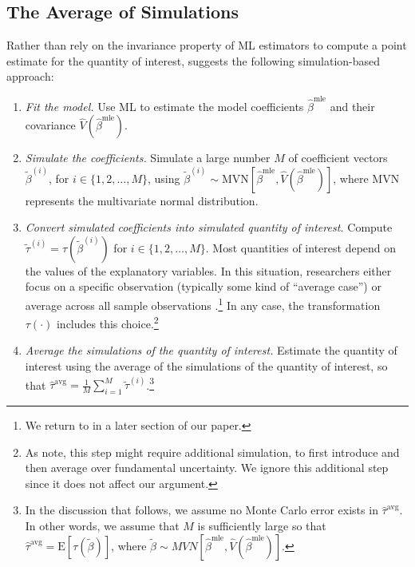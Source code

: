 \documentclass[11pt]{article}
\begin{document}
\subsection*{The Average of Simulations}

Rather than rely on the invariance property of ML estimators to compute a point estimate for the quantity of interest, \cite{KingTomzWittenberg2000} suggests the following simulation-based approach:\vspace{.1in}
\begin{enumerate}
\item \textit{Fit the model.}
Use ML to estimate the model coefficients $\hat{\beta}^{\text{mle}}$ and their covariance $\hat{V} \left( \hat{\beta}^{\text{mle}} \right)$.
\item \textit{Simulate the coefficients.}
Simulate a large number $M$ of coefficient vectors $\tilde{\beta}^{(i)}$, for $i \in \{1, 2,\ldots, M\}$, using $\tilde{\beta}^{(i)} \sim \text{MVN} \left[ \hat{\beta}^{\text{mle}}, \hat{V} \left( \hat{\beta}^{\text{mle}} \right) \right]$, where MVN represents the multivariate normal distribution.
\item \textit{Convert simulated coefficients into simulated quantity of interest.}
Compute $\tilde{\tau}^{(i)} = \tau \left( \tilde{\beta}^{(i)} \right)$ for $i \in \{1, 2,\ldots, M\}$.
Most quantities of interest depend on the values of the explanatory variables.
In this situation, researchers either focus on a specific observation (typically some kind of ``average case'') or average across all sample observations \citep{HanmerKalkan2013}.\footnote{We return to \cite{HanmerKalkan2013} in a later section of our paper.}
In any case, the transformation $\tau(\cdot)$ includes this choice.\footnote{As \cite{KingTomzWittenberg2000} note, this step might require additional simulation, to first introduce and then average over fundamental uncertainty.
We ignore this additional step since it does not affect our argument.}
\item \textit{Average the simulations of the quantity of interest.}
Estimate the quantity of interest using the average of the simulations of the quantity of interest, so that $\hat{\tau}^{\text{avg}} = \frac{1}{M} \sum_{i = 1}^{M} \tilde{\tau}^{(i)}$.\footnote{In the discussion that follows, we assume no Monte Carlo error exists in $\hat{\tau}^{\text{avg}}$.
In other words, we assume that $M$ is sufficiently large so that $\hat{\tau}^{\text{avg}} = \text{E}\left[ \tau \left(\tilde{\beta} \right) \right]$, where $\tilde{\beta} \sim MVN \left[ \hat{\beta}^{\text{mle}}, \hat{V} \left( \hat{\beta}^{\text{mle}} \right) \right]$.}\\
\end{enumerate}
\end{document}
